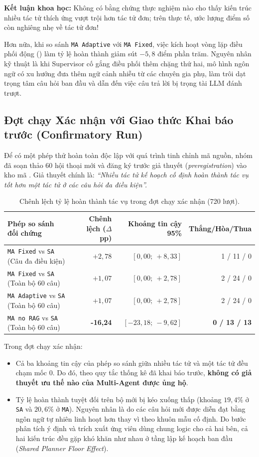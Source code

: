 \textbf{Kết luận khoa học:} Không có bằng chứng thực nghiệm nào cho thấy kiến trúc nhiều tác tử thích ứng vượt trội hơn tác tử đơn; trên thực tế, ước lượng điểm số còn nghiêng nhẹ về tác tử đơn! 

Hơn nữa, khi so sánh \texttt{MA Adaptive} với \texttt{MA Fixed}, việc kích hoạt vòng lặp điều phối động () làm tỷ lệ hoàn thành giảm sút $-5{,}8$ điểm phần trăm. Nguyên nhân kỹ thuật là khi Supervisor cố gắng điều phối thêm chặng thứ hai, mô hình ngôn ngữ có xu hướng đưa thêm ngữ cảnh nhiễu từ các chuyên gia phụ, làm trôi dạt trọng tâm câu hỏi ban đầu và dẫn đến việc câu trả lời bị trọng tài LLM đánh trượt.

\subsection{Đợt chạy Xác nhận với Giao thức Khai báo trước (Confirmatory Run)}
Để có một phép thử hoàn toàn độc lập với quá trình tinh chỉnh mã nguồn, nhóm đã soạn thảo 60 hội thoại mới và đăng ký trước giả thuyết (\textit{preregistration}) vào kho mã . Giả thuyết chính là: \textit{``Nhiều tác tử kế hoạch cố định hoàn thành tác vụ tốt hơn một tác tử ở các câu hỏi đa điều kiện''.}

\begin{table}[htbp]\small
\caption{Chênh lệch tỷ lệ hoàn thành tác vụ trong đợt chạy xác nhận (720 lượt).}
\label{tab:confirmatory_results}
\begin{tabularx}{\linewidth}{Yrrr}\toprule
Phép so sánh đối chứng & Chênh lệch ($\Delta$ pp) & Khoảng tin cậy 95\% & Thắng/Hòa/Thua\\\midrule
\texttt{MA Fixed} vs \texttt{SA} (Câu đa điều kiện) & $+2{,}78$ & $[0{,}00;\ +8{,}33]$ & 1 / 11 / 0\\
\texttt{MA Fixed} vs \texttt{SA} (Toàn bộ 60 câu) & $+1{,}07$ & $[0{,}00;\ +2{,}78]$ & 2 / 24 / 0\\
\texttt{MA Adaptive} vs \texttt{SA} (Toàn bộ 60 câu) & $+1{,}07$ & $[0{,}00;\ +2{,}78]$ & 2 / 24 / 0\\
\texttt{MA no RAG} vs \texttt{SA} (Toàn bộ 60 câu) & \textbf{-16,24} & $[-23{,}18;\ -9{,}62]$ & \textbf{0 / 13 / 13}\\\bottomrule
\end{tabularx}
\end{table}

Trong đợt chạy xác nhận:
\begin{itemize}
    \item Cả ba khoảng tin cậy của phép so sánh giữa nhiều tác tử và một tác tử đều chạm mốc 0. Do đó, theo quy tắc thống kê đã khai báo trước, \textbf{không có giả thuyết ưu thế nào của Multi-Agent được ủng hộ}.
    \item Tỷ lệ hoàn thành tuyệt đối trên bộ mới bị kéo xuống thấp (khoảng $19{,}4\%$ ở \texttt{SA} và $20{,}6\%$ ở \texttt{MA}). Nguyên nhân là do các câu hỏi mới được diễn đạt bằng ngôn ngữ tự nhiên linh hoạt hơn thay vì theo khuôn mẫu cố định. Do bước phân tích ý định và trích xuất ứng viên dùng chung logic cho cả hai bên, cả hai kiến trúc đều gặp khó khăn như nhau ở tầng lập kế hoạch ban đầu (\textit{Shared Planner Floor Effect}).
\end{itemize}

